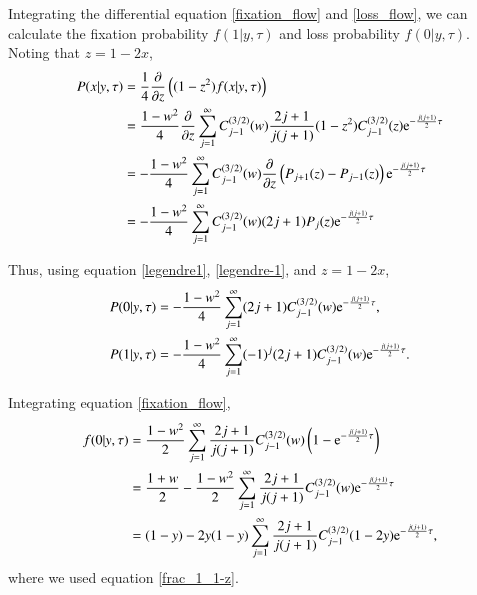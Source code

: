\documentclass{article}
\begin{document}
Integrating the differential equation \eqref{fixation_flow} and \eqref{loss_flow}, we can calculate the fixation probability $f(1|y,\tau)$ and loss probability $f(0|y,\tau)$.
Noting that $z = 1-2x$,
\begin{align}
 P(x|y, \tau) & = \frac{1}{4} \frac{\partial {}}{\partial {z}} \left( (1-z^2) f(x|y,\tau)\right)\\
 & = \frac{1-w^2}{4} \frac{\partial {}}{\partial {z}} \sum_{j=1}^{\infty} C^{(3/2)}_{j-1} (w) \frac{2j+1}{j(j+1)} (1-z^2) C^{(3/2)}_{j-1} (z) \mathrm{e}^{-\frac{j(j+1)}{2}\tau}\\
 & = - \frac{1-w^2}{4} \sum_{j=1}^{\infty} C^{(3/2)}_{j-1} (w) \frac{\partial {}}{\partial {z}} \left( P_{j+1}(z) - P_{j-1}(z) \right) \mathrm{e}^{-\frac{j(j+1)}{2}\tau}\\
 & = - \frac{1-w^2}{4} \sum_{j=1}^{\infty} C^{(3/2)}_{j-1} (w) (2j+1)P_{j}(z) \mathrm{e}^{-\frac{j(j+1)}{2}\tau}
\end{align}

Thus, using equation \eqref{legendre1}, \eqref{legendre-1}, and $z=1-2x$,
\begin{align}
 P(0|y, \tau) & = - \frac{1-w^2}{4} \sum_{j=1}^{\infty} (2j+1) C^{(3/2)}_{j-1} (w) \mathrm{e}^{-\frac{j(j+1)}{2}\tau},\\
 P(1|y, \tau) & = - \frac{1-w^2}{4} \sum_{j=1}^{\infty} (-1)^j (2j+1) C^{(3/2)}_{j-1} (w) \mathrm{e}^{-\frac{j(j+1)}{2}\tau}.
\end{align}

Integrating equation \eqref{fixation_flow},
\begin{align}
 f(0|y,\tau) & = \frac{1-w^2}{2} \sum_{j=1}^{\infty} \frac{2j+1}{j(j+1)} C^{(3/2)}_{j-1} (w) \left(1 - \mathrm{e}^{-\frac{j(j+1)}{2}\tau} \right)\\
 & = \frac{1+w}{2} - \frac{1-w^2}{2} \sum_{j=1}^{\infty} \frac{2j+1}{j(j+1)} C^{(3/2)}_{j-1} (w) \mathrm{e}^{-\frac{j(j+1)}{2}\tau}\\
 & = (1-y) - 2y(1-y) \sum_{j=1}^{\infty} \frac{2j+1}{j(j+1)} C^{(3/2)}_{j-1} (1-2y) \mathrm{e}^{-\frac{j(j+1)}{2}\tau},\label{fixation}
\end{align}
where we used equation \eqref{frac_1_1-z}.
\end{document}

